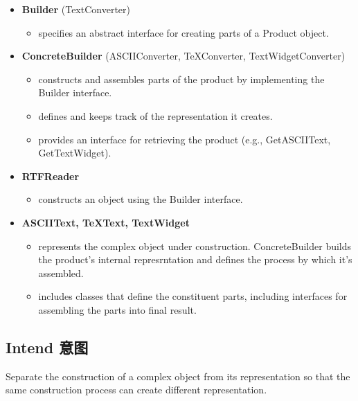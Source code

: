 \begin{itemize}
\small
\item \textbf{Builder} (TextConverter)

	\begin{itemize}
		\item specifies an abstract interface for creating parts of a Product object.
	\end{itemize}

\item \textbf{ConcreteBuilder} (ASCIIConverter, TeXConverter, TextWidgetConverter)

	\begin{itemize}
		\item constructs and assembles parts of the product by implementing the Builder interface.

		\item defines and keeps track of the representation it creates.

		\item provides an interface for retrieving the product (e.g., GetASCIIText, GetTextWidget).
	\end{itemize}

\item \textbf{RTFReader}

	\begin{itemize}
		\item constructs an object using the Builder interface.
	\end{itemize}

\item \textbf{ASCIIText, TeXText, TextWidget}

	\begin{itemize}
		\item represents the complex object under construction. ConcreteBuilder builds the product's internal represrntation and defines the process by which it's assembled.

		\item includes classes that define the constituent parts, including interfaces for assembling the parts into final result.
	\end{itemize}
\normalize
\end{itemize}

\subsection{Intend 意图}

Separate the construction of a complex object from its representation so that the same construction process can create different representation.

